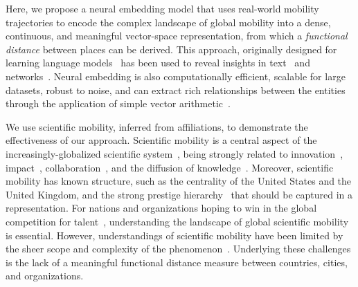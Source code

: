 \documentclass[12pt]{article} %
\begin{document}
Here, we propose a neural embedding model that uses real-world mobility trajectories to encode the complex landscape of global mobility into a dense, continuous, and meaningful vector-space representation, from which a \textit{functional distance} between places can be derived.
This approach, originally designed for learning language models~\autocite{mikolov2013word2vec} has been used to reveal insights in text~\autocite{linzhuo2020hyperbolic, tshitoyan2019mat2vec, garg2018gender, kozlowski2018geometry, hamilton2016diachronic, le2014doc2vec, nakandala2016twitch} and networks~\autocite{perozzi2014deepwalk, grover2016node2vec}.
Neural embedding is also computationally efficient, scalable for large datasets, robust to noise, and can extract rich relationships between the entities through the application of simple vector arithmetic~\autocite{levy2014neural}. 


We use scientific mobility, inferred from affiliations, to demonstrate the effectiveness of our approach.
Scientific mobility is a central aspect of the increasingly-globalized scientific system~\autocite{czaika2018globalisation, altbach2004globalization}, being strongly related to innovation~\autocite{braunerhjelm2020labor, kaiser2018innovation, armano2017innovation}, impact~\autocite{sugimoto2017mostimpact, petersen2018multiscale, franzoni2014advantage}, collaboration~\autocite{rodrigues2016mobility}, and the diffusion of knowledge~\autocite{braunerhjelm2020labor, azoulay2011diffusion, morgan2018prestige}.
Moreover, scientific mobility has known structure, such as the centrality of the United States and the United Kingdom, and the strong prestige hierarchy~\autocite{auriol2010careers, clauset2015hierarchy, deville2014career} that should be captured in a representation.
For nations and organizations hoping to win in the global competition for talent~\autocite{box2008competition}, understanding the landscape of global scientific mobility is essential. 
However, understandings of scientific mobility have been limited by the sheer scope and complexity of the phenomenon~\autocite{robinson2019mobility, vannoorden2012mobility, deville2014career, ackers2008mobility, scott2015dynamics}.
Underlying these challenges is the lack of a meaningful functional distance measure between countries, cities, and organizations. 
\end{document}
